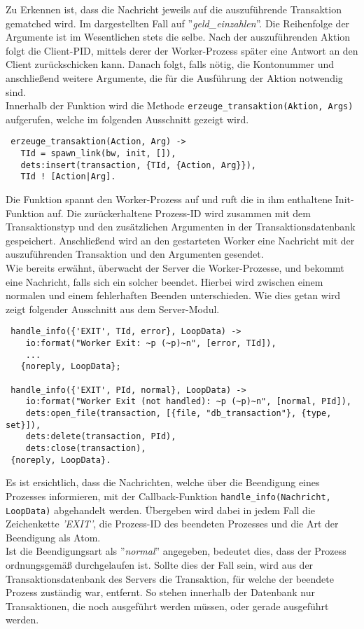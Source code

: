 Zu Erkennen ist, dass die Nachricht jeweils auf die auszuführende Transaktion gematched wird. Im dargestellten Fall auf ''\textit{geld\_einzahlen}''. Die Reihenfolge der Argumente ist im Wesentlichen stets die selbe. Nach der auszuführenden Aktion folgt die Client-PID, mittels derer der Worker-Prozess später eine Antwort an den Client zurückschicken kann. Danach folgt, falls nötig, die Kontonummer und anschließend weitere Argumente, die für die Ausführung der Aktion notwendig sind.\\
Innerhalb der Funktion wird die Methode \texttt{erzeuge\_transaktion(Aktion, Args)} aufgerufen, welche im folgenden Ausschnitt gezeigt wird.
\begin{lstlisting}
 erzeuge_transaktion(Action, Arg) ->
   TId = spawn_link(bw, init, []),
   dets:insert(transaction, {TId, {Action, Arg}}),
   TId ! [Action|Arg].
\end{lstlisting}
Die Funktion spannt den Worker-Prozess auf und ruft die in ihm enthaltene Init-Funktion auf. Die zurückerhaltene Prozess-ID wird zusammen mit dem Transaktionstyp und den zusätzlichen Argumenten in der Transaktionsdatenbank gespeichert. Anschließend wird an den gestarteten Worker eine Nachricht mit der auszuführenden Transaktion und den Argumenten gesendet.\\
Wie bereits erwähnt, überwacht der Server die Worker-Prozesse, und bekommt eine Nachricht, falls sich ein solcher beendet. Hierbei wird zwischen einem normalen und einem fehlerhaften Beenden unterschieden. Wie dies getan wird zeigt folgender Ausschnitt aus dem Server-Modul.
\begin{lstlisting}
 handle_info({'EXIT', TId, error}, LoopData) -> 
    io:format("Worker Exit: ~p (~p)~n", [error, TId]),
    ...
   {noreply, LoopData};

 handle_info({'EXIT', PId, normal}, LoopData) -> 
    io:format("Worker Exit (not handled): ~p (~p)~n", [normal, PId]),
    dets:open_file(transaction, [{file, "db_transaction"}, {type, set}]),
    dets:delete(transaction, PId),
    dets:close(transaction),
 {noreply, LoopData}.
\end{lstlisting}
Es ist ersichtlich, dass die Nachrichten, welche über die Beendigung eines Prozesses informieren, mit der Callback-Funktion \texttt{handle\_info(Nachricht, LoopData)} abgehandelt werden. Übergeben wird dabei in jedem Fall die Zeichenkette \textit{'EXIT'}, die Prozess-ID des beendeten Prozesses und die Art der Beendigung als Atom.\\
Ist die Beendigungsart als ''\textit{normal}'' angegeben, bedeutet dies, dass der Prozess ordnungsgemäß durchgelaufen ist. Sollte dies der Fall sein, wird aus der Transaktionsdatenbank des Servers die Transaktion, für welche der beendete Prozess zuständig war, entfernt. So stehen innerhalb der Datenbank nur Transaktionen, die noch ausgeführt werden müssen, oder gerade ausgeführt werden.\\
